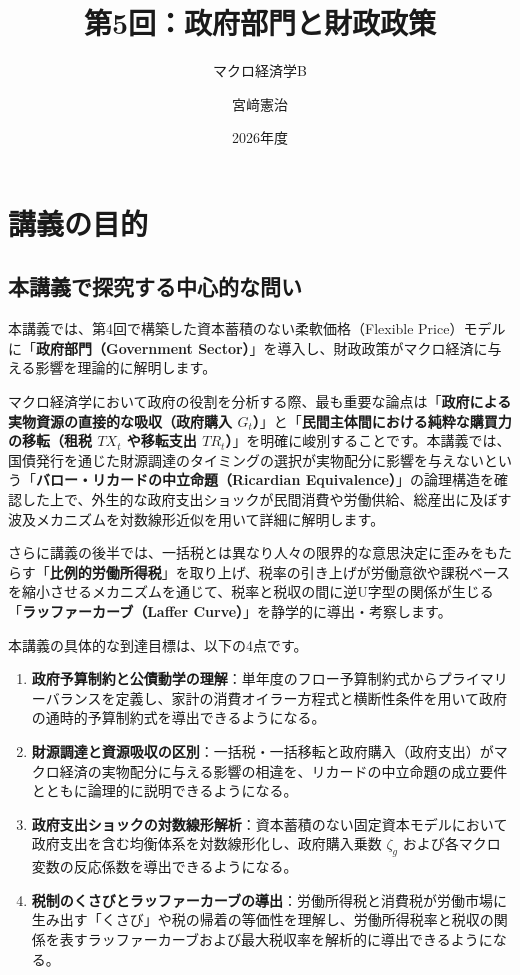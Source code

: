 \documentclass[
  japanese,
  lualatex,
  ja=standard,
  12pt,
  a4paper]{ltjsarticle}
\title{第5回：政府部門と財政政策}
\subtitle{マクロ経済学B}
\author{宮﨑憲治}
\date{2026年度}
\providecommand{\tightlist}{%
  \setlength{\itemsep}{0pt}\setlength{\parskip}{0pt}}
\renewcommand*\contentsname{目次}
\newcommand\contentsname{目次}
\begin{document}
\maketitle

\renewcommand*\contentsname{目次}
{
\setcounter{tocdepth}{3}
\tableofcontents
}

\section{講義の目的}\label{ux8b1bux7fa9ux306eux76eeux7684}

\subsection{本講義で探究する中心的な問い}\label{ux672cux8b1bux7fa9ux3067ux63a2ux7a76ux3059ux308bux4e2dux5fc3ux7684ux306aux554fux3044}

本講義では、第4回で構築した資本蓄積のない柔軟価格（Flexible
Price）モデルに「\textbf{政府部門（Government
Sector）}」を導入し、財政政策がマクロ経済に与える影響を理論的に解明します。

マクロ経済学において政府の役割を分析する際、最も重要な論点は「\textbf{政府による実物資源の直接的な吸収（政府購入
\(G_t\)）}」と「\textbf{民間主体間における純粋な購買力の移転（租税
\(TX_t\) や移転支出
\(TR_t\)）}」を明確に峻別することです。本講義では、国債発行を通じた財源調達のタイミングの選択が実物配分に影響を与えないという「\textbf{バロー・リカードの中立命題（Ricardian
Equivalence）}」の論理構造を確認した上で、外生的な政府支出ショックが民間消費や労働供給、総産出に及ぼす波及メカニズムを対数線形近似を用いて詳細に解明します。

さらに講義の後半では、一括税とは異なり人々の限界的な意思決定に歪みをもたらす「\textbf{比例的労働所得税}」を取り上げ、税率の引き上げが労働意欲や課税ベースを縮小させるメカニズムを通じて、税率と税収の間に逆U字型の関係が生じる「\textbf{ラッファーカーブ（Laffer
Curve）}」を静学的に導出・考察します。

本講義の具体的な到達目標は、以下の4点です。

\begin{enumerate}
\def\labelenumi{\arabic{enumi}.}
\tightlist
\item
  \textbf{政府予算制約と公債動学の理解}：単年度のフロー予算制約式からプライマリーバランスを定義し、家計の消費オイラー方程式と横断性条件を用いて政府の通時的予算制約式を導出できるようになる。
\item
  \textbf{財源調達と資源吸収の区別}：一括税・一括移転と政府購入（政府支出）がマクロ経済の実物配分に与える影響の相違を、リカードの中立命題の成立要件とともに論理的に説明できるようになる。
\item
  \textbf{政府支出ショックの対数線形解析}：資本蓄積のない固定資本モデルにおいて政府支出を含む均衡体系を対数線形化し、政府購入乗数
  \(\zeta_g\) および各マクロ変数の反応係数を導出できるようになる。
\item
  \textbf{税制のくさびとラッファーカーブの導出}：労働所得税と消費税が労働市場に生み出す「くさび」や税の帰着の等価性を理解し、労働所得税率と税収の関係を表すラッファーカーブおよび最大税収率を解析的に導出できるようになる。
\end{enumerate}
\end{document}
